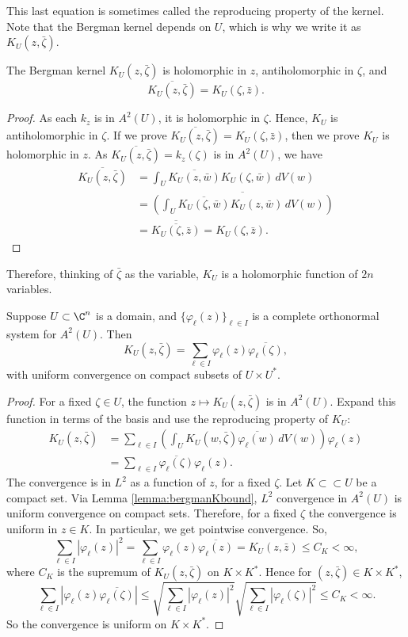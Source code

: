 This last equation is sometimes called the reproducing property of the kernel. Note that the Bergman kernel depends on $U$, which is why we write it as $K_U(z,\bar\zeta)$.
\begin{prop}
The Bergman kernel $K_U(z,\bar\zeta)$ is holomorphic in $z$, antiholomorphic in $\zeta$, and
\[\overline{K_U(z,\bar\zeta)}=K_U(\zeta,\bar z).\]
\end{prop}
\begin{proof}
As each $k_z$ is in $A^2(U)$, it is holomorphic in $\zeta$. Hence, $K_U$ is antiholomorphic in $\zeta$. If we prove $\overline{K_U(z,\bar\zeta)}=K_U(\zeta,\bar z)$, then we prove $K_U$ is holomorphic in $z$. As $\overline{K_U(z,\bar\zeta)}=k_z(\zeta)$ is in $A^2(U)$, we have
\begin{align*}
\overline{K_U(z,\bar\zeta)}&=\int_U\overline{K_U(z,\bar w)}K_U(\zeta,\bar w)\,dV(w)\\
&=\overline{\left(\int_U\overline{K_U(\zeta,\bar w)}K_U(z,\bar w)\,dV(w)\right)}\\
&=\overline{\overline{K_U(\zeta,\bar z)}}=K_U(\zeta,\bar z).
\end{align*}
\end{proof}
Therefore, thinking of $\bar\zeta$ as the variable, $K_U$ is a holomorphic function of $2n$ variables.

\begin{prop}
Suppose $U\subset\C^n$ is a domain, and $\{\varphi_\ell(z)\}_{\ell\in I}$ is a complete orthonormal system for $A^2(U)$. Then
\[K_U(z,\bar\zeta)=\sum_{\ell\in I}\varphi_\ell(z)\overline{\varphi_\ell(\zeta)},\]
with uniform convergence on compact subsets of $U\times U^*$.
\end{prop}
\begin{proof}
For a fixed $\zeta\in U$, the function $z\mapsto K_U(z,\bar\zeta)$ is in $A^2(U)$. Expand this function in terms of the basis and use the reproducing property of $K_U$:
\begin{align*}
K_U(z,\bar\zeta)&=\sum_{\ell\in I}\left(\int_U K_U(w,\bar\zeta)\overline{\varphi_\ell(w)}\,dV(w)\right)\varphi_\ell(z)\\
&=\sum_{\ell\in I}\overline{\varphi_\ell(\zeta)}\varphi_\ell(z).
\end{align*}
The convergence is in $L^2$ as a function of $z$, for a fixed $\zeta$. Let $K\subset\subset U$ be a compact set. Via Lemma \ref{lemma:bergmanKbound}, $L^2$ convergence in $A^2(U)$ is uniform convergence on compact sets. Therefore, for a fixed $\zeta$ the convergence is uniform in $z\in K$. In particular, we get pointwise convergence. So,
\[\sum_{\ell\in I}|\varphi_\ell(z)|^2=\sum_{\ell\in I}\varphi_\ell(z)\overline{\varphi_\ell(z)}=K_U(z,\bar z)\leq C_K<\infty,\]
where $C_K$ is the supremum of $K_U(z,\bar\zeta)$ on $K\times K^*$. Hence for $(z,\bar\zeta)\in K\times K^*$,
\[
\sum_{\ell\in I}|\varphi_\ell(z)\overline{\varphi_\ell(\zeta)}|\leq\sqrt{\sum_{\ell\in I}|\varphi_\ell(z)|^2}\sqrt{\sum_{\ell\in I}|\varphi_\ell(\zeta)|^2}\leq C_K<\infty.
\]
So the convergence is uniform on $K\times K^*$.
\end{proof}
